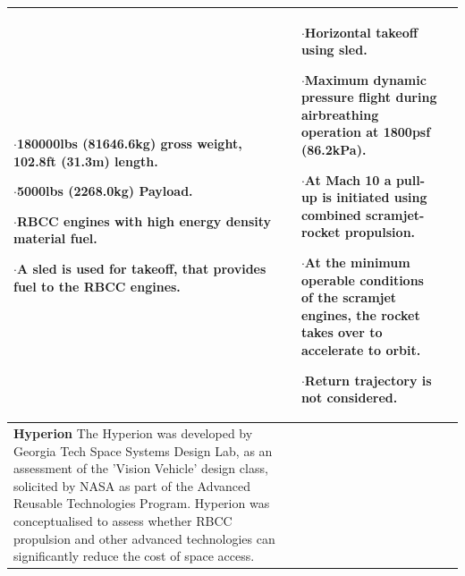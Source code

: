 \begin{xltabular}{\linewidth}{|X|X|X|}
$\cdot$180000lbs (81646.6kg) gross weight, 102.8ft (31.3m) length. 

$\cdot$5000lbs (2268.0kg) Payload.

$\cdot$RBCC engines with high energy density material fuel. 

$\cdot$A sled is used for takeoff, that provides fuel to the RBCC engines. 

&\small {}

$\cdot$Horizontal takeoff using sled.

$\cdot$Maximum dynamic pressure flight during airbreathing operation at 1800psf (86.2kPa).

$\cdot$At Mach 10 a pull-up is initiated using combined scramjet-rocket propulsion. 

$\cdot$At the minimum operable conditions of the scramjet engines, the rocket takes over to accelerate to orbit. 

$\cdot$Return trajectory is not considered. \\

\hline \small\textbf{Hyperion}\cite{Hyperion}\newline \newline 
The Hyperion was developed by Georgia Tech Space Systems Design Lab, as an assessment of the 'Vision Vehicle' design class, solicited by NASA as part of the Advanced Reusable Technologies Program. Hyperion was conceptualised to assess whether RBCC propulsion and other advanced technologies can significantly reduce the cost of space access. 
&\small {}  


\end{xltabular}
